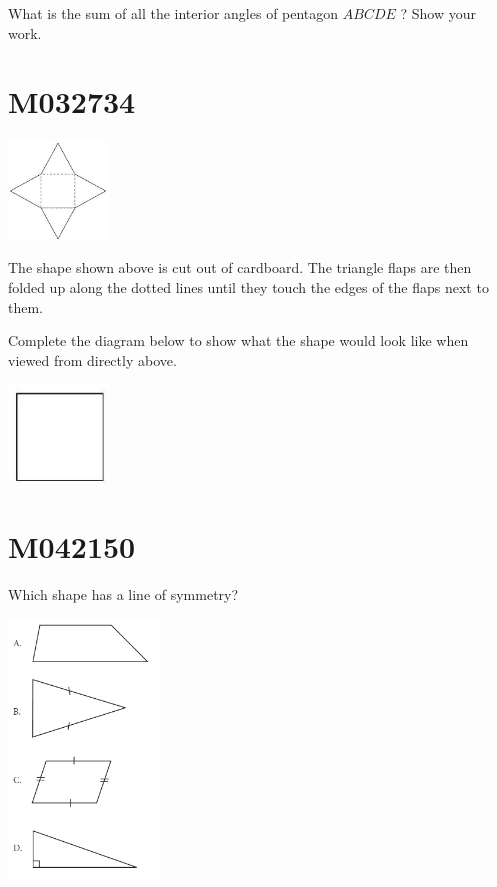 \documentclass[12pt]{article}
\begin{document}
What is the sum of all the interior angles of pentagon $A B C D E$ ? Show your work.

\newpage
\section*{M032734}


\includegraphics[max width=0.2\textwidth]{2024_02_20_828ebc9d68bcc1fbb223g-61(1)}


The shape shown above is cut out of cardboard. The triangle flaps are then folded up along the dotted lines until they touch the edges of the flaps next to them.

Complete the diagram below to show what the shape would look like when viewed from directly above.


\includegraphics[max width=0.2\textwidth]{2024_02_20_828ebc9d68bcc1fbb223g-61}


\newpage
\section*{M042150}

Which shape has a line of symmetry?

\includegraphics[max width=0.3\textwidth]{2024_02_20_828ebc9d68bcc1fbb223g-62}
\end{document}
